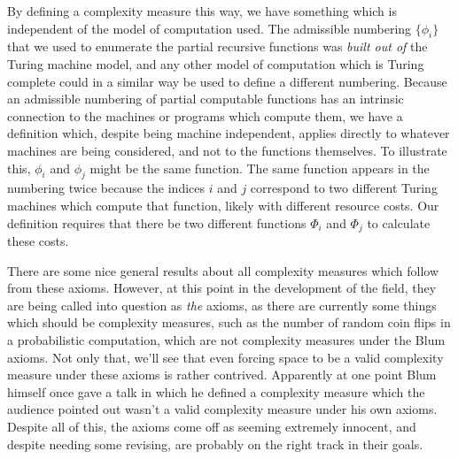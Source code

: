 \par By defining a complexity measure this way, we have something which is independent of the model of computation used. The admissible numbering $\{\phi_i\}$ that we used to enumerate the partial recursive functions was \textit{built out of} the Turing machine model, and any other model of computation which is Turing complete could in a similar way be used to define a different numbering. Because an admissible numbering of partial computable functions has an intrinsic connection to the machines or programs which compute them, we have a definition which, despite being machine independent, applies directly to whatever machines are being considered, and not to the functions themselves. To illustrate this, $\phi_i$ and $\phi_j$ might be the same function. The same function appears in the numbering twice because the indices $i$ and $j$ correspond to two different Turing machines which compute that function, likely with different resource costs. Our definition requires that there be two different functions $\Phi_i$ and $\Phi_j$ to calculate these costs. 
\par There are some nice general results about all complexity measures which follow from these axioms. However, at this point in the development of the field, they are being called into question as \textit{the} axioms, as there are currently some things which should be complexity measures, such as the number of random coin flips in a probabilistic computation, which are not complexity measures under the Blum axioms. Not only that, we'll see that even forcing space to be a valid complexity measure under these axioms is rather contrived. Apparently at one point Blum himself once gave a talk in which he defined a complexity measure which the audience pointed out wasn't a valid complexity measure under his own axioms. Despite all of this, the axioms come off as seeming extremely innocent, and despite needing some revising, are probably on the right track in their goals.

